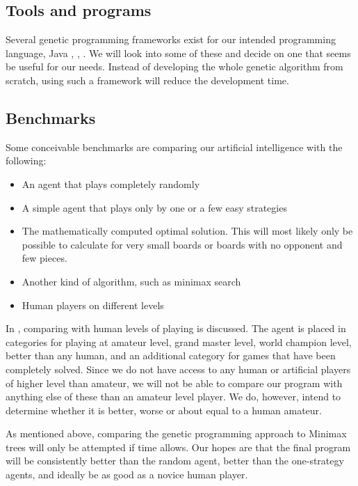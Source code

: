 \documentclass[times, 10pt,twocolumn]{article}
\begin{document}
\subsection{Tools and programs}

Several genetic programming frameworks exist for our intended programming language, Java \cite{genpro}, \cite{jgap}, \cite{n-genes}. We will look into some of these and decide on one that seems be useful for our needs. Instead of developing the whole genetic algorithm from scratch, using such a framework will reduce the development time.

\subsection{Benchmarks}

Some conceivable benchmarks are comparing our artificial intelligence with the following:
\begin{itemize}
	\item{An agent that plays completely randomly}
	\item{A simple agent that plays only by one or a few easy strategies}
	\item{The mathematically computed optimal solution. This will most likely only be possible to calculate for very small boards or boards with no opponent and few pieces.}
	\item{Another kind of algorithm, such as minimax search}
	\item{Human players on different levels}
\end{itemize}

In \cite{games_solved}, comparing with human levels of playing is discussed.  The agent is placed in categories for playing at amateur level, grand master level, world champion level, better than any human, and an additional category for games that have been completely solved. Since we do not have access to any human or artificial players of higher level than amateur, we will not be able to compare our program with anything else of these than an amateur level player. We do, however, intend to determine whether it is better, worse or about equal to a human amateur.

As mentioned above, comparing the genetic programming approach to Minimax trees will only be attempted if time allows. Our hopes are that the final program will be consistently better than the random agent, better than the one-strategy agents, and ideally be as good as a novice human player.
\end{document}
